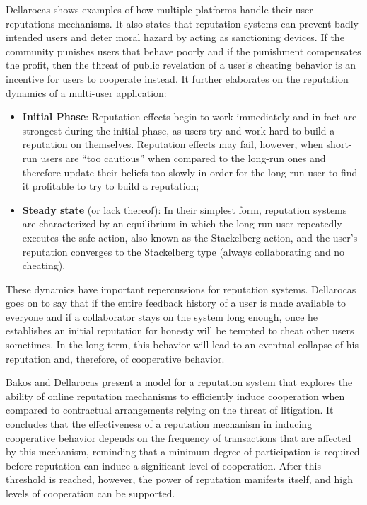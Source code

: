 Dellarocas \cite{Dellarocas2005-rep-mech} shows examples of how multiple platforms handle their user reputations mechanisms. It also states that reputation systems can prevent badly intended users and deter moral hazard by acting as sanctioning devices. If the community punishes users that behave poorly and if the punishment compensates the  profit, then the threat of public revelation of a user's cheating behavior is an incentive for users to cooperate instead. It further elaborates on the reputation dynamics of a multi-user application: 
\begin{itemize}
    \item \textbf{Initial Phase}: Reputation effects begin to work immediately and in fact are strongest during the initial phase, as users try and work hard to build a reputation on themselves. Reputation effects may fail, however, when short-run users are “too cautious” when compared to the long-run ones and therefore update their beliefs too slowly in order for the long-run user to find it profitable to try to build a reputation;
    \item \textbf{Steady state} (or lack thereof): In their simplest form, reputation systems are characterized by an equilibrium in which the long-run user repeatedly executes the safe action, also known as the Stackelberg action, and the user's reputation converges to the Stackelberg type (always collaborating and no cheating).
\end{itemize}

These dynamics have important repercussions for reputation systems. Dellarocas goes on to say that if the entire feedback history of a user is made available to everyone and if a collaborator stays on the system long enough, once he establishes an initial reputation for honesty will be tempted to cheat other users sometimes. In the long term, this behavior will lead to an eventual collapse of his reputation and, therefore, of cooperative behavior.

Bakos and Dellarocas \cite{Bakos2003} present a model for a reputation system that explores the ability of online reputation mechanisms to efficiently induce cooperation when compared to contractual arrangements relying on the threat of litigation. It concludes that the effectiveness of a reputation mechanism in inducing cooperative behavior depends on the frequency of transactions that are affected by this mechanism, reminding that a minimum degree of participation is required before reputation can induce a significant level of cooperation. After this threshold is reached, however, the power of reputation manifests itself, and high levels of cooperation can be supported.

